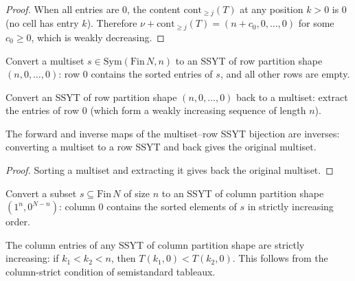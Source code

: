 \begin{proof}
When all entries are $0$, the content $\mathrm{cont}_{\geq j}(T)$ at any
position $k > 0$ is $0$ (no cell has entry $k$). Therefore
$\nu + \mathrm{cont}_{\geq j}(T) = (n + c_0, 0, \ldots, 0)$ for some
$c_0 \geq 0$, which is weakly decreasing.
\end{proof}

\begin{definition}
\label{def.sf.sym-to-row-ssyt}
\leanhelper
\leanok
Convert a multiset $s \in \mathrm{Sym}(\mathrm{Fin}\,N, n)$ to an SSYT of
row partition shape $(n, 0, \ldots, 0)$: row $0$ contains the sorted entries
of $s$, and all other rows are empty.
\end{definition}

\begin{definition}
\label{def.sf.row-ssyt-to-sym}
\leanhelper
\leanok
Convert an SSYT of row partition shape $(n, 0, \ldots, 0)$ back to a
multiset: extract the entries of row $0$ (which form a weakly increasing
sequence of length $n$).
\end{definition}

\begin{lemma}
\label{lem.sf.row-ssyt-roundtrip}
\leanhelper
\leanok
The forward and inverse maps of the multiset--row SSYT bijection are inverses:
converting a multiset to a row SSYT and back gives the original multiset.
\end{lemma}

\begin{proof}
\leanok
Sorting a multiset and extracting it gives back the original multiset.
\end{proof}

\begin{definition}
\label{def.sf.finset-to-col-ssyt}
\leanhelper
\leanok
Convert a subset $s \subseteq \mathrm{Fin}\,N$ of size $n$ to an SSYT
of column partition shape $(1^n, 0^{N-n})$: column $0$ contains the
sorted elements of $s$ in strictly increasing order.
\end{definition}

\begin{lemma}
\label{lem.sf.col-ssyt-entry-strict-mono}
\leanhelper
\leanok
The column entries of any SSYT of column partition shape are
strictly increasing: if $k_1 < k_2 < n$, then $T(k_1, 0) < T(k_2, 0)$.
This follows from the column-strict condition of semistandard tableaux.
\end{lemma}

